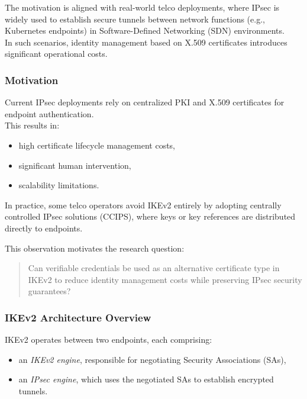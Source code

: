 \noindent
The motivation is aligned with real-world telco deployments, where IPsec is widely used to establish secure tunnels between network functions (e.g., Kubernetes endpoints) in Software-Defined Networking (SDN) environments.\\  
In such scenarios, identity management based on X.509 certificates introduces significant operational costs.

\subsubsection*{Motivation}

\noindent
Current IPsec deployments rely on centralized PKI and X.509 certificates for endpoint authentication.\\
This results in:
\begin{itemize}
    \item high certificate lifecycle management costs,
    \item significant human intervention,
    \item scalability limitations.
\end{itemize}

\noindent
In practice, some telco operators avoid IKEv2 entirely by adopting centrally controlled IPsec solutions (CCIPS), where keys or key references are distributed directly to endpoints.
\medskip

\noindent
This observation motivates the research question:

\begin{quote}
Can verifiable credentials be used as an alternative certificate type in IKEv2 to reduce identity management costs while preserving IPsec security guarantees?
\end{quote}

\subsubsection {IKEv2 Architecture Overview}

\noindent
IKEv2 operates between two endpoints, each comprising:
\begin{itemize}
    \item an \emph{IKEv2 engine}, responsible for negotiating Security Associations (SAs),
    \item an \emph{IPsec engine}, which uses the negotiated SAs to establish encrypted tunnels.
\end{itemize}


